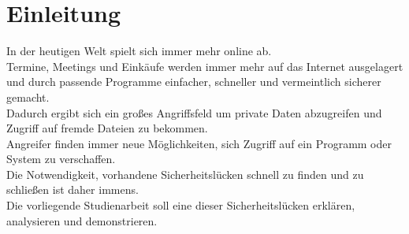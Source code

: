 \section{Einleitung}\label{sec:einleitung}

In der heutigen Welt spielt sich immer mehr online ab.\\
Termine, Meetings und Einkäufe werden immer mehr auf das Internet ausgelagert und durch passende Programme einfacher, schneller und vermeintlich sicherer gemacht.\\

Dadurch ergibt sich ein großes Angriffsfeld um private Daten abzugreifen und Zugriff auf fremde Dateien zu bekommen.\\
Angreifer finden immer neue Möglichkeiten, sich Zugriff auf ein Programm oder System zu verschaffen. \\

Die Notwendigkeit, vorhandene Sicherheitslücken schnell zu finden und zu schließen ist daher immens.\\

Die vorliegende Studienarbeit soll eine dieser Sicherheitslücken erklären, analysieren und demonstrieren.\\